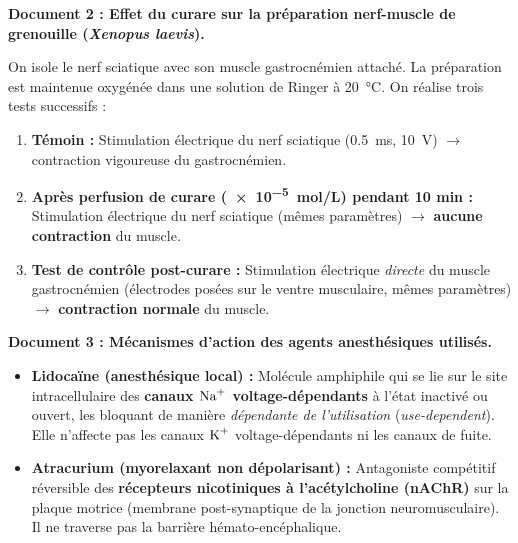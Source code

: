 \documentclass[11pt]{article}
\begin{document}
\textbf{Document 2 : Effet du curare sur la préparation nerf-muscle de grenouille (\emph{Xenopus laevis}).}\par
On isole le nerf sciatique avec son muscle gastrocnémien attaché. La préparation est maintenue oxygénée dans une solution de Ringer à \SI{20}{\celsius}. On réalise trois tests successifs :
\begin{enumerate}
    \item \textbf{Témoin :} Stimulation électrique du nerf sciatique (\SI{0,5}{ms}, \SI{10}{V}) $\rightarrow$ contraction vigoureuse du gastrocnémien.
    \item \textbf{Après perfusion de curare (\SI{e-5}{mol/L}) pendant 10 min :} Stimulation électrique du nerf sciatique (mêmes paramètres) $\rightarrow$ \textbf{aucune contraction} du muscle.
    \item \textbf{Test de contrôle post-curare :} Stimulation électrique \emph{directe} du muscle gastrocnémien (électrodes posées sur le ventre musculaire, mêmes paramètres) $\rightarrow$ \textbf{contraction normale} du muscle.
\end{enumerate}

\textbf{Document 3 : Mécanismes d'action des agents anesthésiques utilisés.}\par
\begin{itemize}
    \item \textbf{Lidocaïne (anesthésique local) :} Molécule amphiphile qui se lie sur le site intracellulaire des \textbf{canaux $\ce{Na+}$ voltage-dépendants} à l'état inactivé ou ouvert, les bloquant de manière \emph{dépendante de l'utilisation} (\emph{use-dependent}). Elle n'affecte pas les canaux $\ce{K+}$ voltage-dépendants ni les canaux de fuite.
    \item \textbf{Atracurium (myorelaxant non dépolarisant) :} Antagoniste compétitif réversible des \textbf{récepteurs nicotiniques à l'acétylcholine (nAChR)} sur la plaque motrice (membrane post-synaptique de la jonction neuromusculaire). Il ne traverse pas la barrière hémato-encéphalique.
\end{itemize}
\end{document}
